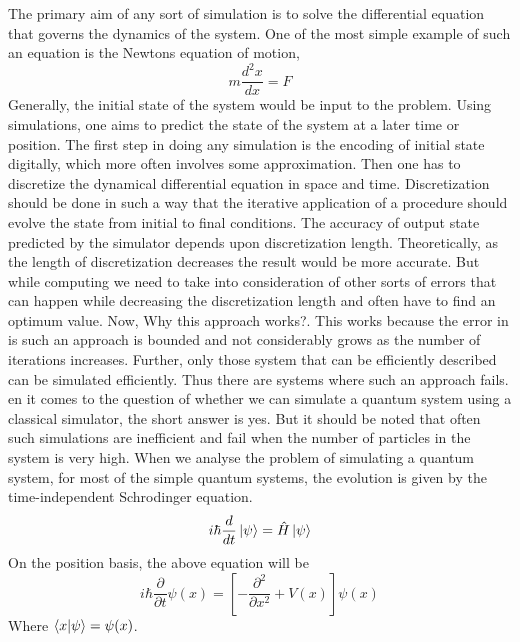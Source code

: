 \documentclass[12pt,a4paper]{report}
\begin{document}
The primary aim of any sort of simulation is to solve the differential equation that governs the dynamics of the system. One of the most simple example of such an equation is the Newtons equation of motion,
\begin{equation}
m\frac{d^{2}x}{dx} = F
\end{equation}
Generally, the initial state of the system would be input to the problem. Using simulations, one aims to predict the state of the system at a later time or position. The first step in doing any simulation is the encoding of initial state digitally, which more often involves some approximation. Then one has to discretize the dynamical differential equation in space and time. Discretization should be done in such a way that the iterative application of a procedure should evolve the state from initial to final conditions. The accuracy of output state predicted by the simulator depends upon discretization length. Theoretically, as the length of discretization decreases the result would be more accurate. But while computing we need to take into consideration of other sorts of errors that can happen while decreasing the discretization length and often have to find an optimum value. Now, Why this approach works?. This works because the error in is such an approach is bounded and not considerably grows as the number of iterations increases. Further, only those system that can be efficiently described can be simulated efficiently. Thus there are systems where such an approach fails.
en it comes to the question of whether we can simulate a quantum system using a classical simulator, the short answer is yes. But it should be noted that often such simulations are inefficient and fail when the number of particles in the system is very high.  When we analyse the problem of simulating a quantum system, for most of the simple quantum systems, the evolution is given by the time-independent Schrodinger equation. 
\begin{equation}
i\hbar \frac{d}{dt}\ket{\psi} = \hat{H} \ket{\psi}
\end{equation}
On the position basis, the above equation will be 
\begin{equation}
i\hbar\frac{\partial}{\partial t}\psi(x)= \left[ -\frac{\partial^{2}}{\partial x^{2}}+V(x)\right] \psi(x)
\end{equation}
Where $\braket{x|\psi} = \psi(x)$.
\end{document}
